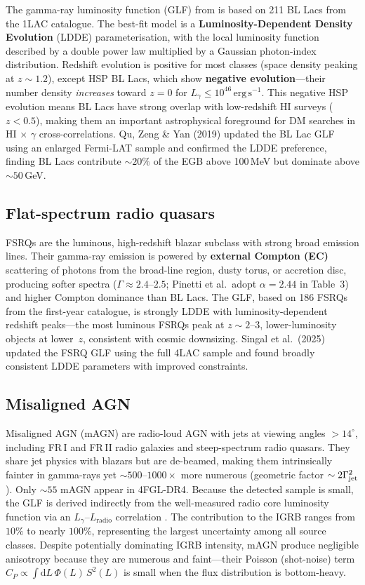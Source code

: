 \documentclass[10pt,a4paper]{article}
\newcommand{\ergs}{\,\mathrm{erg\,s^{-1}}}
\begin{document}
The gamma-ray luminosity function (GLF) from \citet{Ajello2014BLLac} is based on 211 BL Lacs from the 1LAC catalogue. The best-fit model is a \textbf{Luminosity-Dependent Density Evolution} (LDDE) parameterisation, with the local luminosity function described by a double power law multiplied by a Gaussian photon-index distribution. Redshift evolution is positive for most classes (space density peaking at $z \sim 1.2$), except HSP BL Lacs, which show \textbf{negative evolution}---their number density \emph{increases} toward $z = 0$ for $L_\gamma \leq 10^{46}\ergs$. This negative HSP evolution means BL Lacs have strong overlap with low-redshift HI surveys ($z < 0.5$), making them an important astrophysical foreground for DM searches in HI$\,\times\,\gamma$ cross-correlations. Qu, Zeng \& Yan (2019) updated the BL Lac GLF using an enlarged Fermi-LAT sample and confirmed the LDDE preference, finding BL Lacs contribute $\sim20\%$ of the EGB above 100\,MeV but dominate above $\sim50$\,GeV.

\subsection{Flat-spectrum radio quasars}
\label{sec:fsrq}

FSRQs are the luminous, high-redshift blazar subclass with strong broad emission lines. Their gamma-ray emission is powered by \textbf{external Compton (EC)} scattering of photons from the broad-line region, dusty torus, or accretion disc, producing softer spectra ($\Gamma \approx 2.4$--$2.5$; Pinetti et al.\ adopt $\alpha = 2.44$ in Table~3) and higher Compton dominance than BL Lacs. The \citet{Ajello2012FSRQ} GLF, based on 186 FSRQs from the first-year catalogue, is strongly LDDE with luminosity-dependent redshift peaks---the most luminous FSRQs peak at $z \sim 2$--$3$, lower-luminosity objects at lower~$z$, consistent with cosmic downsizing. Singal et al.\ (2025) updated the FSRQ GLF using the full 4LAC sample and found broadly consistent LDDE parameters with improved constraints.

\subsection{Misaligned AGN}
\label{sec:magn}

Misaligned AGN (mAGN) are radio-loud AGN with jets at viewing angles $> 14^\circ$, including FR\,I and FR\,II radio galaxies and steep-spectrum radio quasars. They share jet physics with blazars but are de-beamed, making them intrinsically fainter in gamma-rays yet $\sim500$--$1000\times$ more numerous (geometric factor $\sim 2\Gamma_{\rm jet}^2$). Only $\sim55$ mAGN appear in 4FGL-DR4. Because the detected sample is small, the GLF is derived indirectly from the well-measured radio core luminosity function via an $L_\gamma$--$L_{\mathrm{radio}}$ correlation \citep{DiMauro2014}. The contribution to the IGRB ranges from $10\%$ to nearly $100\%$, representing the largest uncertainty among all source classes. Despite potentially dominating IGRB intensity, mAGN produce negligible anisotropy because they are numerous and faint---their Poisson (shot-noise) term $C_P \propto \int \mathrm{d}L\,\Phi(L)\,S^2(L)$ is small when the flux distribution is bottom-heavy.
\end{document}
